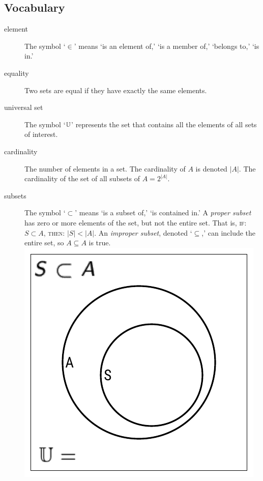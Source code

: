 \documentclass[11pt]{article}%
\begin{document}
\begin{multicols}{2}
\subsection{Vocabulary}
\label{Vocabulary}


\begin{description}

\item[element] The symbol `$\in$' means `is an element of,' `is a member
of,' `belongs to,' `is in.'

\item[equality] Two sets are equal if they have exactly the same
elements.

\item[universal set] The symbol `$\mathbb{U}$' represents the set that
contains all the elements of all sets of interest.

\item[cardinality] The number of elements in a set. The cardinality
of $A$ is denoted $|A|$. The cardinality of the set of all subsets
of $A = 2^{|A|}$.

\item[subsets] The symbol `$\subset$' means `is a subset of,' `is
contained in.' A \textit{proper subset} has zero or more elements of the set, but not the entire set. That is, \textsc{if}: $S \subset A$, \textsc{then}: $|S| < |A|$. An \textit{improper subset}, denoted `$\subseteq$,' can include the entire set, so $A \subseteq A$ is true. \includegraphics*[scale = 0.75]{../../images/venn-subset.pdf} 


\end{description}
\end{multicols}
\end{document}
